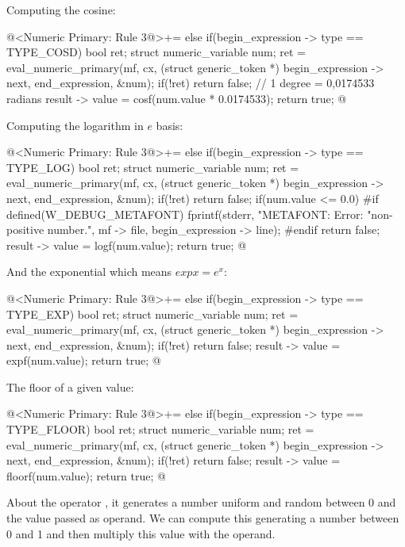 Computing the cosine:

\iniciocodigo
@<Numeric Primary: Rule 3@>+=
else if(begin_expression -> type == TYPE_COSD){
  bool ret;
  struct numeric_variable num;
  ret = eval_numeric_primary(mf, cx, (struct generic_token *)
                             begin_expression -> next,
                             end_expression, &num);
  if(!ret)
    return false;
  // 1 degree = 0,0174533 radians
  result -> value = cosf(num.value * 0.0174533);
  return true;
}
@
\fimcodigo

Computing the logarithm in $e$ basis:

\iniciocodigo
@<Numeric Primary: Rule 3@>+=
else if(begin_expression -> type == TYPE_LOG){
  bool ret;
  struct numeric_variable num;
  ret = eval_numeric_primary(mf, cx, (struct generic_token *)
                             begin_expression -> next,
                             end_expression, &num);
  if(!ret)
    return false;
  if(num.value <= 0.0){
#if defined(W_DEBUG_METAFONT)
    fprintf(stderr, "METAFONT: Error: %
            "non-positive number.\n", mf -> file,
            begin_expression -> line);
#endif
    return false;
  }
  result -> value = logf(num.value);
  return true;
}
@
\fimcodigo

And the exponential which means $exp x = e^x$:

\iniciocodigo
@<Numeric Primary: Rule 3@>+=
else if(begin_expression -> type == TYPE_EXP){
  bool ret;
  struct numeric_variable num;
  ret = eval_numeric_primary(mf, cx, (struct generic_token *)
                             begin_expression -> next,
                             end_expression, &num);
  if(!ret)
    return false;
  result -> value = expf(num.value);
  return true;
}
@
\fimcodigo

The floor of a given value:

\iniciocodigo
@<Numeric Primary: Rule 3@>+=
else if(begin_expression -> type == TYPE_FLOOR){
  bool ret;
  struct numeric_variable num;
  ret = eval_numeric_primary(mf, cx, (struct generic_token *)
                             begin_expression -> next,
                             end_expression, &num);
  if(!ret)
    return false;
  result -> value = floorf(num.value);
  return true;
}
@
\fimcodigo

About the operator , it generates a number
uniform and random between 0 and the value passed as operand. We can
compute this generating a number between 0 and 1 and then multiply
this value with the operand.

